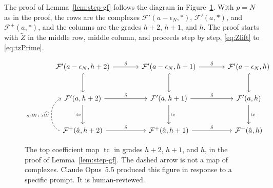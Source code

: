 \documentclass[12pt]{amsart}
\theoremstyle{definition}
\theoremstyle{remark}
\newcommand{\tc}{\operatorname{tc}}
\def\what{\hat}
\newcommand{\TZ}{\tilde Z}
\newcommand{\FF}{\mathcal F}
\begin{document}
The proof of Lemma~\ref{lem:step-gf}
follows the diagram in Figure~\ref{fig:tc}.
With $p = N$ as in the proof, 
the rows are the complexes $\FF'(a-\epsilon_N,*)$,
$\FF'(a,*)$, and $\FF^+(\what a,*)$, and the columns are the grades $h+2$,
$h+1$, and $h$.
The proof starts with $\TZ$ in the middle row, middle column,
and proceeds step by step, \eqref{eq:Zlift} to \eqref{eq:tzPrime}.
\begin{figure}[tbp]
\[
\begin{tikzcd}[column sep=large, row sep=large]
\FF'(a-\epsilon_N,h+2) \arrow[r,"\delta"] \arrow[d,hook]
& \FF'(a-\epsilon_N,h+1) \arrow[r,"\delta"] \arrow[d,hook]
& \FF'(a-\epsilon_N,h) \arrow[d,hook] \\
\FF'(a,h+2) \arrow[r,"\delta"] \arrow[d,"\tc"']
& \FF'(a,h+1) \arrow[r,"\delta"] \arrow[d,"\tc"]
& \FF'(a,h) \arrow[d,"\tc"] \\
\FF^+(\what a,h+2) \arrow[r,"\delta"]
  \arrow[u, dashed, start anchor=west, end anchor=west, bend left=70,
         "\sigma: W\mapsto\widehat W"]
& \FF^+(\what a,h+1) \arrow[r,"\delta"]
& \FF^+(\what a,h)
\end{tikzcd}
\]
\caption{The top coefficient map $\tc$ in grades $h+2$, $h+1$, and $h$, in
the proof of Lemma~\ref{lem:step-gf}.  The dashed arrow is not a map of
complexes.
Claude Opus~5.5 produced this figure in response to a specific prompt.
It is human-reviewed.}
\label{fig:tc}
\end{figure}
\end{document}

